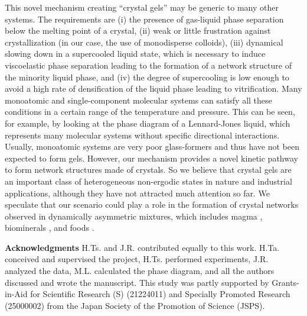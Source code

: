 \documentclass[12pt]{article}
\begin{document}
This novel mechanism creating ``crystal gels'' may be generic to many other 
systems. The requirements are (i) the presence of gas-liquid phase separation below the melting point of a crystal, (ii) 
weak or little frustration against crystallization (in our case, the use of monodisperse colloids), 
(iii) dynamical slowing down in a supercooled liquid state, which is necessary to induce viscoelastic phase separation leading to the formation 
of a network structure of the minority liquid phase, and (iv) the degree of supercooling is low enough to avoid a high rate of densification of the liquid phase 
leading to vitrification.   
Many monoatomic and single-component molecular systems can satisfy all these conditions in a certain range of the temperature and pressure. 
This can be seen, for example, by looking at the phase diagram of a Lennard-Jones liquid, which represents many molecular systems 
without specific directional interactions. 
Usually, monoatomic systems are very poor glass-formers and thus have not been expected to form gels. 
However, our mechanism provides a novel kinetic pathway to form network structures made of crystals.  
So we believe that crystal gels are an important class of heterogeneous non-ergodic states in nature 
and industrial applications, although they have not attracted much attention so far.  
We speculate that our scenario could play a role in the formation of crystal networks observed in dynamically asymmetric mixtures, 
which includes magma \cite{philpotts1998role}, biominerals \cite{rousseau2005multiscale}, and foods \cite{deman1987fat}. 




\noindent
{\bf Acknowledgments}
\noindent
H.Ts. and J.R. contributed equally to this work. 
H.Ta. conceived and supervised the project, H.Ts. performed experiments, J.R. analyzed the data, M.L. calculated the phase diagram, and all the authors discussed and wrote the manuscript. 
This study was partly supported by Grants-in-Aid for Scientific Research (S) (21224011) and Specially Promoted Research (25000002) from the Japan Society of the Promotion of Science (JSPS).



\clearpage
\end{document}
